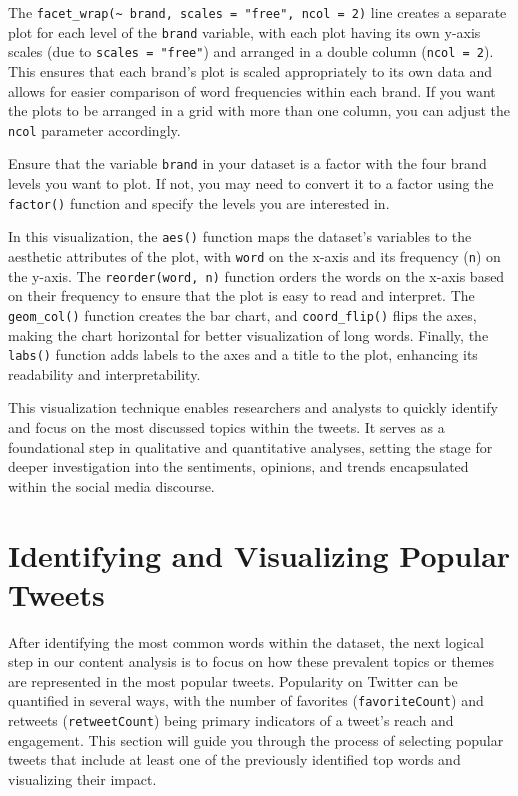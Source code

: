 \documentclass[
]{book}
\begin{document}
The \texttt{facet\_wrap(\textasciitilde{}\ brand,\ scales\ =\ "free",\ ncol\ =\ 2)} line creates a separate plot for each level of the \texttt{brand} variable, with each plot having its own y-axis scales (due to \texttt{scales\ =\ "free"}) and arranged in a double column (\texttt{ncol\ =\ 2}). This ensures that each brand's plot is scaled appropriately to its own data and allows for easier comparison of word frequencies within each brand. If you want the plots to be arranged in a grid with more than one column, you can adjust the \texttt{ncol} parameter accordingly.

Ensure that the variable \texttt{brand} in your dataset is a factor with the four brand levels you want to plot. If not, you may need to convert it to a factor using the \texttt{factor()} function and specify the levels you are interested in.

In this visualization, the \texttt{aes()} function maps the dataset's variables to the aesthetic attributes of the plot, with \texttt{word} on the x-axis and its frequency (\texttt{n}) on the y-axis. The \texttt{reorder(word,\ n)} function orders the words on the x-axis based on their frequency to ensure that the plot is easy to read and interpret. The \texttt{geom\_col()} function creates the bar chart, and \texttt{coord\_flip()} flips the axes, making the chart horizontal for better visualization of long words. Finally, the \texttt{labs()} function adds labels to the axes and a title to the plot, enhancing its readability and interpretability.

This visualization technique enables researchers and analysts to quickly identify and focus on the most discussed topics within the tweets. It serves as a foundational step in qualitative and quantitative analyses, setting the stage for deeper investigation into the sentiments, opinions, and trends encapsulated within the social media discourse.

\hypertarget{identifying-and-visualizing-popular-tweets}{%
\section{Identifying and Visualizing Popular Tweets}\label{identifying-and-visualizing-popular-tweets}}

After identifying the most common words within the dataset, the next logical step in our content analysis is to focus on how these prevalent topics or themes are represented in the most popular tweets. Popularity on Twitter can be quantified in several ways, with the number of favorites (\texttt{favoriteCount}) and retweets (\texttt{retweetCount}) being primary indicators of a tweet's reach and engagement. This section will guide you through the process of selecting popular tweets that include at least one of the previously identified top words and visualizing their impact.
\end{document}
